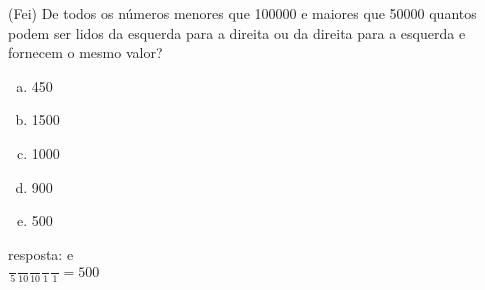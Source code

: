 \begin{ex}
 (Fei) De todos os números menores que 100000 e maiores que 50000 quantos podem ser lidos da esquerda para a direita ou da direita para a esquerda e fornecem o mesmo valor?
    \begin{enumerate}[(a)]
    \item 450
    \item 1500
    \item 1000
    \item 900
    \item 500
    \end{enumerate}
      \begin{sol}
        resposta: e \\
        $\frac{\phantom{A}}{5}\frac{\phantom{A}}{10}\frac{\phantom{A}}{10}\frac{\phantom{A}}{1}\frac{\phantom{A}}{1}=500$
      \end{sol}
\end{ex}